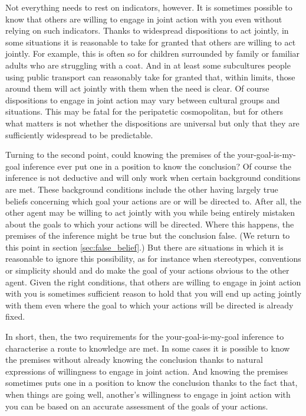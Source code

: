 \documentclass[14pt,a4paper]{extarticle}
\begin{document}
Not everything needs to rest on indicators, however.
It is sometimes possible to know that others are willing to engage in joint action with you even without relying on such indicators.  
Thanks to widespread dispositions to act jointly, in some situations it is reasonable to take for granted that others are willing to act jointly.  
For example, this is often so for children surrounded by family or familiar adults who are struggling with a coat.  
And in at least some subcultures people using public transport can reasonably take for granted that, within limits, those around them will act jointly with them when the need is clear.
Of course dispositions to engage in joint action may vary between cultural groups and situations.
This may be fatal for the peripatetic cosmopolitan,
but for others what matters is not whether the dispositions are universal but only that they are sufficiently widespread to be predictable.

Turning to the second point,
could knowing the premises of the your-goal-is-my-goal inference ever put one in a position to know the conclusion?  
Of course the inference is not deductive and will only work when certain background conditions are met.  
These background conditions include the other having largely true beliefs concerning which goal your actions are or will be directed to.
After all, the other agent may be willing to act jointly with you while being entirely mistaken about the goals to which your actions will be directed.
Where this happens, the premises of the inference might be true but the conclusion false.
(We return to this point in section \vref{sec:false_belief}.)  
But there are situations in which it is reasonable  to ignore  this possibility, as for instance when stereotypes, conventions or simplicity should and do make the goal of your actions obvious to the other agent.
Given the right conditions,
that others are willing to engage in joint action with you 
is sometimes sufficient reason to hold that
you will end up acting jointly with them
 even where the goal to which your actions will be directed is already fixed.

In short, then, the two requirements for the your-goal-is-my-goal inference to characterise a route to knowledge are met.  
In some cases it is possible to know the premises without already knowing the conclusion thanks to natural expressions of willingness to engage in joint action.  
And knowing the premises sometimes puts one in a position to know the conclusion thanks to the fact that, when things are going well, another's willingness to engage in joint action with you can be based on an accurate assessment of the goals of your actions.
\end{document}
